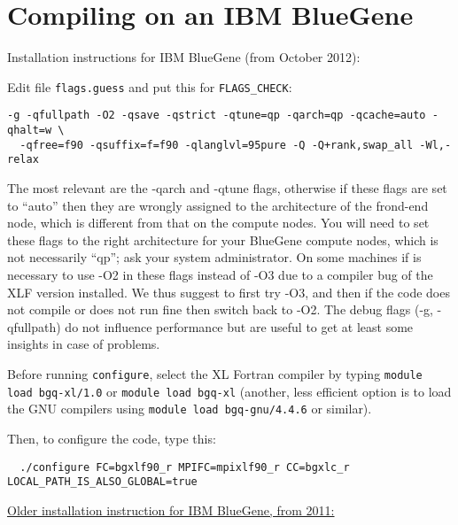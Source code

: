 \section{Compiling on an IBM BlueGene}

\noindent
Installation instructions for IBM BlueGene (from October 2012):\newline

\noindent
Edit file \texttt{flags.guess} and put this for \texttt{FLAGS\_CHECK}:
{\small
\begin{verbatim}
-g -qfullpath -O2 -qsave -qstrict -qtune=qp -qarch=qp -qcache=auto -qhalt=w \
  -qfree=f90 -qsuffix=f=f90 -qlanglvl=95pure -Q -Q+rank,swap_all -Wl,-relax
\end{verbatim}
}

\noindent
The most relevant are the -qarch and -qtune flags, otherwise if these flags are set to ``auto'' then they are wrongly assigned to
the architecture of the frond-end node, which is different from that on the compute nodes.
You will need to set these flags to the right architecture for your BlueGene compute nodes, which is not necessarily ``qp'';
ask your system administrator.
On some machines if is necessary to use -O2 in these flags instead of -O3 due to a compiler bug of the XLF version installed.
We thus suggest to first try -O3, and then if the code does not compile or does not run fine then switch back to -O2.
The debug flags (-g, -qfullpath) do not influence performance but are useful to get at least some insights in case of problems.\newline

\noindent
Before running \texttt{configure}, select the XL Fortran compiler by typing \texttt{module load bgq-xl/1.0}
or \texttt{module load bgq-xl} (another, less efficient option is to load the GNU compilers using \texttt{module load bgq-gnu/4.4.6} or similar).\newline

\noindent
Then, to configure the code, type this:
{\small
\begin{verbatim}
  ./configure FC=bgxlf90_r MPIFC=mpixlf90_r CC=bgxlc_r LOCAL_PATH_IS_ALSO_GLOBAL=true
\end{verbatim}
}

\noindent
\underline{Older installation instruction for IBM BlueGene, from 2011:}\newline

